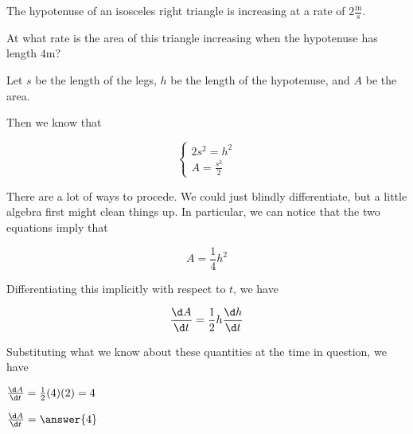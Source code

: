 \documentclass{ximera}
\author{Steven Gubkin}
\begin{document}
\begin{exercise}



The hypotenuse of an isosceles right triangle is increasing at a rate of $2 \frac{\textrm{m}}{\textrm{s}}$.

At what rate is the area of this triangle increasing when the hypotenuse has length $4 \textrm{m}$?

\begin{hint}
	Let $s$ be the length of the legs, $h$ be the length of the hypotenuse, and $A$ be the area. 

	Then we know that

\[
\begin{cases}
	2s^2 = h^2\\
	A=\frac{s^2}{2}
\end{cases}
\]

\end{hint}

\begin{hint}
	There are a lot of ways to procede.  We could just blindly differentiate, but a little algebra first might clean things up.  In particular, we can notice that the two equations imply that

\[
A = \frac{1}{4} h^2
\]
\end{hint}

\begin{hint}
	Differentiating this implicitly with respect to $t$, we have

\[
\frac{\d A}{\d t} = \frac{1}{2} h \frac{\d h}{\d t}
\]
\end{hint}

\begin{hint}
	Substituting what we know about these quantities at the time in question, we have

$\frac{\d A}{\d t} = \frac{1}{2} (4) (2) = 4$
\end{hint}

\begin{prompt}
	$\frac{\d A}{\d t} = \answer{4}$
\end{prompt}

\end{exercise}
\end{document}
